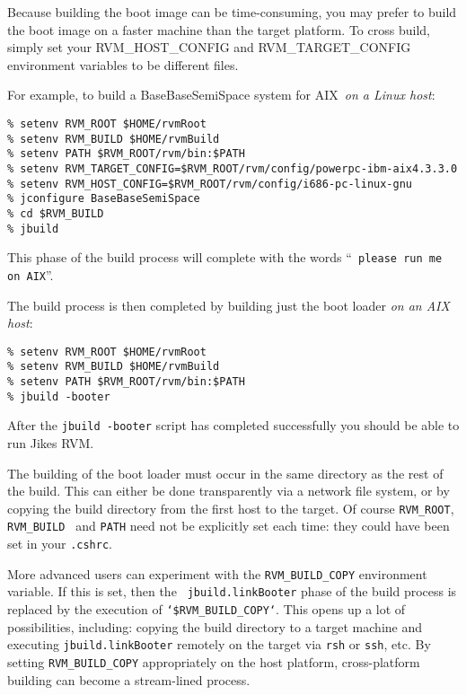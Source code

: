 Because building the boot image can be time-consuming,
you may prefer to build the boot image
on a faster machine than the target platform.  To cross build, simply
set your 
RVM\_HOST\_CONFIG and RVM\_TARGET\_CONFIG environment variables to
be different files.

For example, to build a BaseBaseSemiSpace system for AIX\AIXTMFootnote\
{\em on a Linux host}:
\begin{verbatim}
% setenv RVM_ROOT $HOME/rvmRoot
% setenv RVM_BUILD $HOME/rvmBuild
% setenv PATH $RVM_ROOT/rvm/bin:$PATH
% setenv RVM_TARGET_CONFIG=$RVM_ROOT/rvm/config/powerpc-ibm-aix4.3.3.0
% setenv RVM_HOST_CONFIG=$RVM_ROOT/rvm/config/i686-pc-linux-gnu
% jconfigure BaseBaseSemiSpace
% cd $RVM_BUILD
% jbuild
\end{verbatim}

This phase of the build process will complete with the words ``{\tt
  please run me on AIX}''.


The build process is then completed by building just the boot loader {\em
  on an AIX host}:

\begin{verbatim}
% setenv RVM_ROOT $HOME/rvmRoot
% setenv RVM_BUILD $HOME/rvmBuild
% setenv PATH $RVM_ROOT/rvm/bin:$PATH
% jbuild -booter
\end{verbatim}

After the {\tt jbuild -booter} script has completed successfully you should be able 
to run Jikes RVM. 

The building of the boot loader must occur in the same directory as
the rest of the build.  This can either be done transparently via a
network file system, or by copying the build directory from the first
host to the target.  Of course {\tt RVM\_ROOT}, {\tt RVM\_BUILD }
and {\tt PATH} need not be explicitly set each time: they could have
been set in your {\tt .cshrc}.

More advanced users can experiment with the {\tt RVM\_BUILD\_COPY}
environment variable.  If this is set, then the {\tt
  jbuild.linkBooter} phase of the build process is replaced by the
execution of {\tt `\$RVM\_BUILD\_COPY`}.  This opens up a lot of
possibilities, including: copying the build directory to a target
machine and executing {\tt jbuild.linkBooter} remotely on the target
via {\tt rsh} or {\tt ssh}, etc.  By setting {\tt RVM\_BUILD\_COPY}
appropriately on the host platform, cross-platform building can become
a stream-lined process.

\JikesAIXTMFooter

\JavaTMFooter

